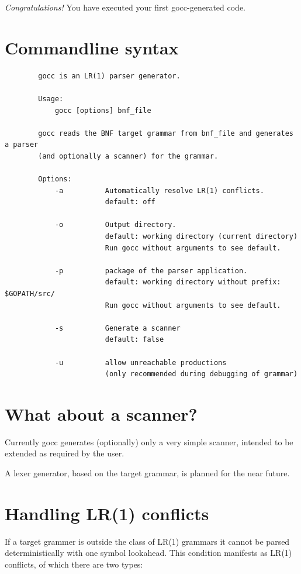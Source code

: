 \documentclass[12pt]{article}
\begin{document}
		{\em Congratulations!} You have executed your first gocc-generated code.

\section{Commandline syntax}\label{sec:commandline}
	\begin{verbatim}
		gocc is an LR(1) parser generator.

		Usage:
		    gocc [options] bnf_file

		gocc reads the BNF target grammar from bnf_file and generates a parser 
		(and optionally a scanner) for the grammar.

		Options:
		    -a          Automatically resolve LR(1) conflicts.
		                default: off

		    -o          Output directory.
		                default: working directory (current directory)
		                Run gocc without arguments to see default.

		    -p          package of the parser application.
		                default: working directory without prefix: $GOPATH/src/
		                Run gocc without arguments to see default.

		    -s          Generate a scanner
		                default: false

		    -u          allow unreachable productions 
		                (only recommended during debugging of grammar)
	\end{verbatim}

\section{What about a scanner?}\label{sec:scanner}
	Currently gocc generates (optionally) only a very simple scanner, intended to be extended as required by the user.

	A lexer generator, based on the target grammar, is planned for the near future.

\section{Handling LR(1) conflicts} \label{sec:lr conflicts}
	If a target grammer is outside the class of LR(1) grammars it cannot be parsed deterministically with one symbol lookahead. This condition manifests as LR(1) conflicts, of which there are two types:
\end{document}
